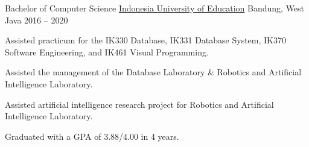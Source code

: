 


\begin{cventries}


\cventry
{Bachelor of Computer Science} %
{\href{https://www.upi.edu/}{Indonesia University of Education}} %
{Bandung, West Java} %
{2016 -- 2020} %
{ %
\begin{cvitems}
\item {Assisted practicum for the IK330 Database, IK331 Database System, IK370 Software Engineering, and IK461 Visual Programming.}
\item {Assisted the management of the Database Laboratory \& Robotics and Artificial Intelligence Laboratory.}
\item {Assisted artificial intelligence research project for Robotics and Artificial Intelligence Laboratory.}
\item {Graduated with a GPA of 3.88/4.00 in 4 years.}
\end{cvitems}
}


\end{cventries}
